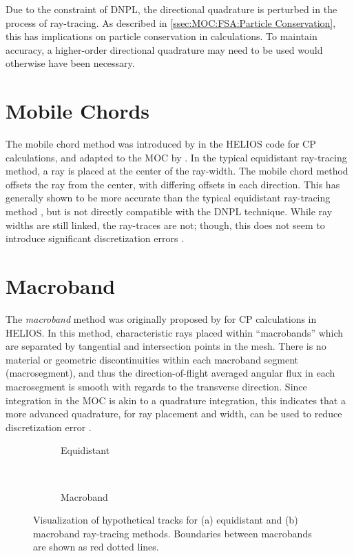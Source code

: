 {{        Due to the constraint of \ac{DNPL}, the directional quadrature is perturbed in the process of ray-tracing.
        As described in \cref{ssec:MOC:FSA:Particle Conservation}, this has implications on particle conservation in calculations.
        To maintain accuracy, a higher-order directional quadrature may need to be used would otherwise have been necessary.
    }
    \section{Mobile Chords}{\label{sec:RT:Mobile Chords}
        The mobile chord method was introduced by \citet{Villarino1992} in the HELIOS code for \ac{CP} calculations, and adapted to the \ac{MOC} by \citet{Yamamoto2008}.
        In the typical equidistant ray-tracing method, a ray is placed at the center of the ray-width.
        The mobile chord method offsets the ray from the center, with differing offsets in each direction.
        This has generally shown to be more accurate than the typical equidistant ray-tracing method \cite{Yamamoto2008}, but is not directly compatible with the \ac{DNPL} technique.
        While ray widths are still linked, the ray-traces are not; though, this does not seem to introduce significant discretization errors \cite{Yamamoto2008}.
    }
    \section{Macroband}{\label{sec:RT:Macroband}
        The \emph{macroband} method  was originally proposed by \citet{Villarino1992} for \ac{CP} calculations in HELIOS.
        In this method, characteristic rays placed within ``macrobands'' which are separated by tangential and intersection points in the mesh.
        There is no material or geometric discontinuities within each macroband segment (macrosegment), and thus the direction-of-flight averaged angular flux in each macrosegment is smooth with regards to the transverse direction.
        Since integration in the \ac{MOC} is akin to a quadrature integration, this indicates that a more advanced quadrature, for ray placement and width, can be used to reduce discretization error \cite{Yamamoto2005}.

       \begin{figure}[h]
            \centering
            \begin{subfigure}[t]{0.45\linewidth}
                \centering
                \def\svgwidth{0.85\linewidth}
                
                \caption{Equidistant}
            \end{subfigure}%
            ~
            \begin{subfigure}[t]{0.45\linewidth}
                \centering
                \def\svgwidth{0.85\linewidth}
                
                \caption{Macroband}
            \end{subfigure}
            \caption{Visualization of hypothetical tracks for (a) equidistant and (b) macroband ray-tracing methods. Boundaries between macrobands are shown as red dotted lines.}
            \label{fig:RT:Equidisant vs Macroband}
        \end{figure}

}}
